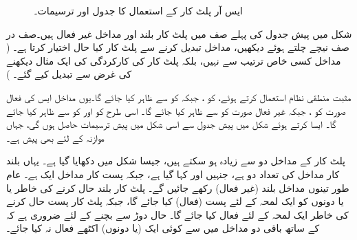 \begin{figure}
\begin{subfigure}{0.45\textwidth}
\end{subfigure}
\caption{ایس آر پلٹ کار کے استعمال کا جدول اور ترسیمات۔}
\label{جدول_ترتیبی_ایس_آر_کام}
\end{figure}

شکل  میں پیش جدول کی پہلے صف میں پلٹ کار بلند  اور مداخل غیر فعال ہیں۔صف در صف نیچے چلتے ہوئے دیکھیں، مداخل تبدیل کرنے سے پلٹ کار کیا حال اختیار کرتا ہے۔ ( مداخل کسی خاص ترتیب سے نہیں، بلکہ پلٹ کار کی کارکردگی کی ایک مثال دیکھنے کی غرض سے تبدیل کیے گئے۔ )

مثبت منطقی نظام استعمال کرتے ہوئے، کو ، جبکہ  کو  سے ظاہر کیا جائے گا۔یوں مداخل ایس کی فعال صورت  کو ، جبکہ غیر فعال صورت  کو  سے ظاہر کیا جائے گا۔ اسی طرح  کو  اور  کو  سے ظاہر کیا جائے گا۔ ایسا کرتے ہوئے شکل  میں پیش جدول سے اسی شکل میں پیش ترسیمات حاصل ہوں گی، جہاں موازنہ کے لئے  بھی پیش ہے۔




پلٹ کار کے مداخل دو سے زیادہ ہو سکتے ہیں، جیسا شکل  میں دکھایا گیا ہے۔ یہاں بلند کار مداخل کی تعداد دو ہے، جنہیں  اور  کہا گیا ہے، جبکہ پست کار مداخل ایک ہے۔ عام طور تینوں مداخل بلند (غیر فعال) رکھے جائیں گے۔ پلٹ کار بلند حال کرنے کی خاطر  یا  یا دونوں کو ایک لمحہ کے لئے پست (فعال) کیا جائے گا، جبکہ پلٹ کار پست حال کرنے کی خاطر  ایک لمحہ کے لئے فعال کیا جائے گا۔ حال دوڑ سے بچنے کے لئے ضروری ہے کہ  کے ساتھ باقی دو مداخل میں سے کوئی ایک (یا دونوں) اکٹھے فعال نہ کیا جائے۔


